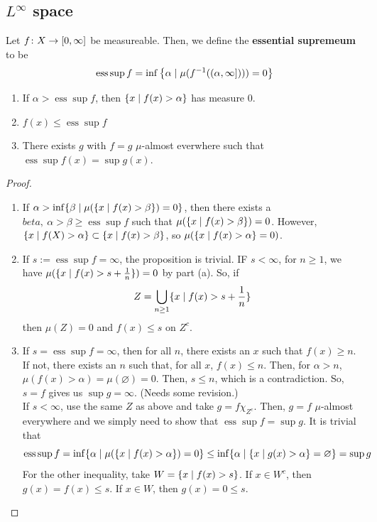 \documentclass[11pt,leqno,oneside]{amsbook}
\numberwithin{thm}{section}
\newcommand{\ess}{\operatorname{ess}}
\renewcommand{\emptyset}{\varnothing}
\renewcommand{\de}{\textbf} %
\begin{document}
\subsection{\(L^\infty\) space}
\begin{defn}
  Let \(f \colon X \to [0,\infty]\) be measureable. Then, we define the
  \de{essential supremeum} to be \[
    \ess\sup f = \inf \left\{ \alpha \st \mu(f^{-1}((\alpha,\infty])))
      = 0 \right\}
  \]
\end{defn}
\begin{prop}
  \begin{enumerate}
  \item If \(\alpha > \ess\sup f\), then \(\{x \mid f(x) > \alpha\}\)
    has measure 0.
  \item \(f(x) \leq \ess \sup f\)
  \item There exists \(g\) with \(f = g\) \(\mu\)-almost everwhere
    such that \(\ess \sup f(x) = \sup g(x)\).
  \end{enumerate}
\end{prop}
\begin{proof}
  \begin{enumerate}
  \item If \(\alpha > \inf \{\beta \mid \mu(\{x \mid f(x) > \beta\}) =
    0\}\), then there exists a \(beta,\ \alpha > \beta \geq \ess\sup
    f\) such that \(\mu(\{x \mid f(x) > \beta\}) = 0\). However, \(\{x
    \mid f(X) > \alpha\} \subset \{x \mid f(x) > \beta\}\), so \(\mu(\{x
    \mid f(x) > \alpha\} = 0)\).
  \item If \(s := \ess \sup f = \infty\), the proposition is
    trivial. IF \(s < \infty\), for \(n \geq 1\), we have \(\mu(\{x
    \mid f(x) > s + \frac{1}{n}\}) = 0\) by part (a). So, if \[
      Z = \bigcup_{n \geq 1} \{x \mid f(x) > s + \frac{1}{n}\}
    \]
    then \(\mu(Z) = 0\) and \(f(x) \leq s\) on \(Z^c\).
  \item If \(s = \ess\sup f = \infty\), then for all \(n\), there
    exists an \(x\) such that \(f(x) \geq n\). If not, there exists an
    \(n\) such that, for all \(x\), \(f(x) \leq n\). Then, for
    \(\alpha > n\), \(\mu(f(x) > \alpha) = \mu(\emptyset) = 0\). Then,
    \(s \leq n\), which is a contradiction. So, \(s = f\) gives us
    \(\sup g = \infty\). (Needs some revision.) \\

    If \(s < \infty\), use the same \(Z\) as above and take \(g = f
    \chi_{Z^c}\). Then, \(g = f\) \(\mu\)-almost everywhere and we
    simply need to show that \(\ess \sup f = \sup g\). It is trivial
    that \[
      \ess\sup f = \inf \{\alpha \st \mu(\{x \st f(x) > \alpha\}) = 0\} \leq \inf
      \{\alpha \st \{x \st g(x) > \alpha\} = \emptyset\} = \sup g
    \]
    For the other inequality, take \(W = \{x \mid f(x) > s\}\). If \(x
    \in W^c\), then \(g(x) = f(x) \leq s\). If \(x \in W\), then
    \(g(x) = 0 \leq s\).
  \end{enumerate}
\end{proof}
\end{document}

